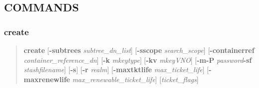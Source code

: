 \documentclass[letterpaper,10pt,english]{sphinxmanual}
\begin{document}
\subsection{COMMANDS}
\label{admin/admin_commands/kdb5_ldap_util:kdb5-ldap-util-options-end}\label{admin/admin_commands/kdb5_ldap_util:commands}

\subsubsection{create}
\label{admin/admin_commands/kdb5_ldap_util:create}\label{admin/admin_commands/kdb5_ldap_util:kdb5-ldap-util-create}\begin{quote}

\textbf{create}
{[}\textbf{-subtrees} \emph{subtree\_dn\_list}{]}
{[}\textbf{-sscope} \emph{search\_scope}{]}
{[}\textbf{-containerref} \emph{container\_reference\_dn}{]}
{[}\textbf{-k} \emph{mkeytype}{]}
{[}\textbf{-kv} \emph{mkeyVNO}{]}
{[}\textbf{-m\textbar{}-P} \emph{password}\textbar{}\textbf{-sf} \emph{stashfilename}{]}
{[}\textbf{-s}{]}
{[}\textbf{-r} \emph{realm}{]}
{[}\textbf{-maxtktlife} \emph{max\_ticket\_life}{]}
{[}\textbf{-maxrenewlife} \emph{max\_renewable\_ticket\_life}{]}
{[}\emph{ticket\_flags}{]}
\end{quote}
\end{document}
